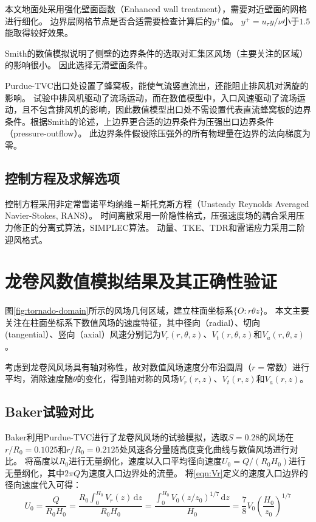 本文地面处采用强化壁面函数（Enhanced wall treatment\cite{fluent2015user}），需要对近壁面的网格进行细化。
边界层网格节点是否合适需要检查计算后的$y^{+}$值。
$y^{+}=u_{\tau} y/\nu$小于$1.5$能取得较好效果。

Smith的数值模拟\cite{smith1987effect}说明了侧壁的边界条件的选取对汇集区风场（主要关注的区域）的影响很小。
因此选择无滑壁面条件。

Purdue-TVC出口处设置了蜂窝板，能使气流竖直流出，还能阻止排风机对涡旋的影响。
试验中排风机驱动了流场运动，而在数值模型中，入口风速驱动了流场运动，且不包含排风机的影响，因此数值模型出口处不需设置代表直流蜂窝板的边界条件。根据Smith\cite{smith1987effect}的论述，上边界更合适的边界条件为压强出口边界条件（pressure-outflow）。
此边界条件假设除压强外的所有物理量在边界的法向梯度为零\cite{fluent2015user}。

\subsection{控制方程及求解选项}
控制方程采用非定常雷诺平均纳维－斯托克斯方程（Unsteady Reynolds Averaged Navier-Stokes, RANS）。
时间离散采用一阶隐性格式，压强速度场的耦合采用压力修正的分离式算法，SIMPLEC算法。
动量、TKE、TDR和雷诺应力采用二阶迎风格式。



\section{龙卷风数值模拟结果及其正确性验证}\label{sec:tornado}
图\ref{fig:tornado-domain}所示的风场几何区域，建立柱面坐标系$\{O:r \theta z\}$。
本文主要关注在柱面坐标系下数值风场的速度特征，其中径向（radial）、切向(tangential）、竖向（axial）风速分别记为$V_r(r,\theta,z)$、$V_t(r,\theta,z)$和$V_a(r,\theta,z)$。

考虑到龙卷风风场具有轴对称性，故对数值风场速度分布沿圆周（$r=$常数）进行平均，消除速度随$\theta$的变化，得到轴对称的风场$V_r(r,z)$、$V_t(r,z)$和$V_a(r,z)$。


\subsection{Baker试验对比}
Baker利用Purdue-TVC进行了龙卷风风场的试验模拟\cite{baker1981boundary}，选取$S=0.28$的风场在$r/R_0=0.1025$和$r/R_0=0.2125$处风速各分量随高度变化曲线与数值风场进行对比。
将高度以$R_0$进行无量纲化，速度以入口平均径向速度$U_0=Q/(R_0 H_0)$进行无量纲化，其中$2\pi Q$为速度入口边界处的流量。
将\eqref{eqn:Vr}定义的速度入口边界的径向速度代入可得：
\begin{equation}
	U_0 = \frac{Q}{R_0 H_0} = \frac{R_0 \int_0^{H_0} V_r(z)\,\mathrm{d}z}{R_0 H_0} = \frac{\int_0^{H_0} V_0 (z/z_0)^{1/7}\,\mathrm{d}z}{H_0} = \frac{7}{8} V_0 \left(\frac{H_0}{z_0}\right)^{1/7}
\end{equation}

